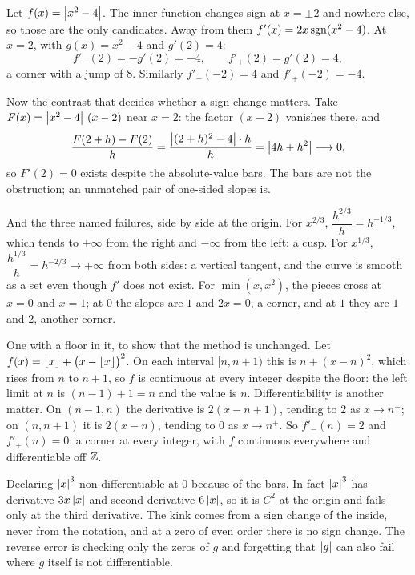\begin{worked}
Let $f(x)=\left\lvert x^{2}-4\right\rvert$. The inner function changes sign at $x=\pm2$ and nowhere else, so those are the only candidates. Away from them $f'(x)=2x\operatorname{sgn}(x^{2}-4)$. At $x=2$, with $g(x)=x^{2}-4$ and $g'(2)=4$:
\[
f'_{-}(2)=-g'(2)=-4,\qquad f'_{+}(2)=g'(2)=4 ,
\]
a corner with a jump of $8$. Similarly $f'_{-}(-2)=4$ and $f'_{+}(-2)=-4$.

Now the contrast that decides whether a sign change matters. Take $F(x)=\left\lvert x^{2}-4\right\rvert\,(x-2)$ near $x=2$: the factor $(x-2)$ vanishes there, and
\[
\frac{F(2+h)-F(2)}{h}=\frac{\left\lvert (2+h)^{2}-4\right\rvert\cdot h}{h}=\left\lvert 4h+h^{2}\right\rvert\longrightarrow0 ,
\]
so $F'(2)=0$ exists despite the absolute-value bars. The bars are not the obstruction; an unmatched pair of one-sided slopes is.

And the three named failures, side by side at the origin. For $x^{2/3}$, $\dfrac{h^{2/3}}{h}=h^{-1/3}$, which tends to $+\infty$ from the right and $-\infty$ from the left: a cusp. For $x^{1/3}$, $\dfrac{h^{1/3}}{h}=h^{-2/3}\to+\infty$ from both sides: a vertical tangent, and the curve is smooth as a set even though $f'$ does not exist. For $\min(x,x^{2})$, the pieces cross at $x=0$ and $x=1$; at $0$ the slopes are $1$ and $2x=0$, a corner, and at $1$ they are $1$ and $2$, another corner.

One with a floor in it, to show that the method is unchanged. Let $f(x)=\left\lfloor x\right\rfloor+\bigl(x-\left\lfloor x\right\rfloor\bigr)^{2}$. On each interval $[n,n+1)$ this is $n+(x-n)^{2}$, which rises from $n$ to $n+1$, so $f$ is continuous at every integer despite the floor: the left limit at $n$ is $(n-1)+1=n$ and the value is $n$. Differentiability is another matter. On $(n-1,n)$ the derivative is $2(x-n+1)$, tending to $2$ as $x\to n^{-}$; on $(n,n+1)$ it is $2(x-n)$, tending to $0$ as $x\to n^{+}$. So $f'_{-}(n)=2$ and $f'_{+}(n)=0$: a corner at every integer, with $f$ continuous everywhere and differentiable off $\mathbb{Z}$.
\end{worked}

\begin{trap}
Declaring $\left\lvert x\right\rvert^{3}$ non-differentiable at $0$ because of the bars. In fact $\left\lvert x\right\rvert^{3}$ has derivative $3x\left\lvert x\right\rvert$ and second derivative $6\left\lvert x\right\rvert$, so it is $C^{2}$ at the origin and fails only at the third derivative. The kink comes from a sign change of the inside, never from the notation, and at a zero of even order there is no sign change. The reverse error is checking only the zeros of $g$ and forgetting that $\left\lvert g\right\rvert$ can also fail where $g$ itself is not differentiable.
\end{trap}

